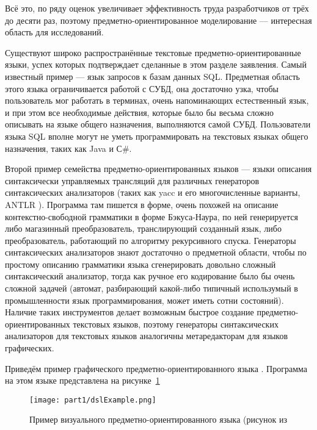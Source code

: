 Всё это, по ряду оценок
увеличивает эффективность труда разработчиков от трёх до десяти раз, поэтому 
предметно-ориентированное моделирование --- интересная область для исследований.

Существуют широко распространённые текстовые предметно-ориентированные языки, 
успех которых подтверждает сделанные в этом разделе заявления. Самый известный 
пример --- язык запросов к базам данных SQL. Предметная область этого языка 
ограничивается работой с СУБД, она достаточно узка, чтобы пользователь мог 
работать в терминах, очень напоминающих естественный язык, и при этом все 
необходимые действия, которые было бы весьма сложно описывать на языке общего 
назначения, выполняются самой СУБД. Пользователи языка SQL вполне могут не уметь 
программировать на текстовых языках общего назначения, таких как Java и С#. 

Второй пример семейства предметно-ориентированных языков --- языки описания 
синтаксически управляемых трансляций для различных генераторов синтаксических 
анализаторов (таких как yacc и его многочисленные варианты, ANTLR
). Программа там пишется в форме, очень похожей на описание контекстно-свободной 
грамматики в форме Бэкуса-Наура, по ней генерируется либо магазинный 
преобразователь, транслирующий созданный язык, либо преобразователь, работающий 
по алгоритму рекурсивного спуска. Генераторы синтаксических анализаторов знают 
достаточно о предметной области, чтобы по простому описанию грамматики языка 
сгенерировать довольно сложный синтаксический анализатор, тогда как ручное его 
кодирование было бы очень сложной задачей (автомат, разбирающий какой-либо 
типичный использумый в промышленности язык программирования, может иметь сотни 
состояний). Наличие таких инструментов делает возможным быстрое создание 
предметно-ориентированных текстовых языков, поэтому генераторы синтаксических 
анализаторов для текстовых языков аналогичны метаредакторам для языков 
графических.

Приведём пример графического предметно-ориентированного языка 
. Программа на этом языке представлена на рисунке~\ref{dslExample}

\begin{figure} [ht]
	\begin{center}
		\texttt{[image: part1/dslExample.png]}
		\caption{Пример визуального предметно-ориентированного языка (рисунок из\cite{kelly2008domain}}
		\label{dslExample}
	\end{center}
\end{figure}

